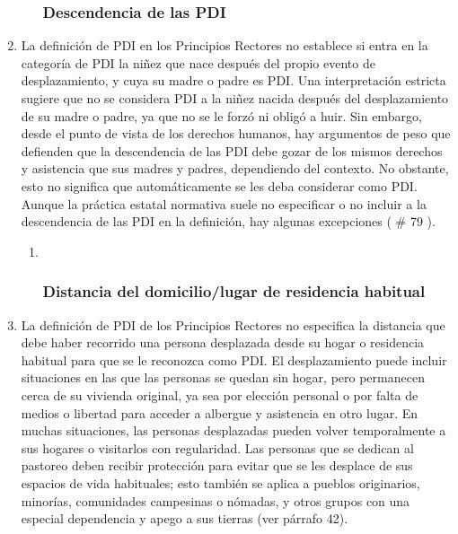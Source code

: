 \documentclass[
]{book}
\begin{document}
\begin{enumerate}
\begin{enumerate}
{    \subsubsection{Descendencia de las PDI}\label{descendencia-de-las-pdi}}
  \end{enumerate}
\item
  La definición de PDI en los Principios Rectores no establece si entra en la categoría de PDI la niñez que nace después del propio evento de desplazamiento, y cuya su madre o padre es PDI. Una interpretación estricta sugiere que no se considera PDI a la niñez nacida después del desplazamiento de su madre o padre, ya que no se le forzó ni obligó a huir. Sin embargo, desde el punto de vista de los derechos humanos, hay argumentos de peso que defienden que la descendencia de las PDI debe gozar de los mismos derechos y asistencia que sus madres y padres, dependiendo del contexto. No obstante, esto no significa que automáticamente se les deba considerar como PDI. Aunque la práctica estatal normativa suele no especificar o no incluir a la descendencia de las PDI en la definición, hay algunas excepciones (
  \# 79
  ).

  \begin{enumerate}
  \def\labelenumii{\arabic{enumii}.}
  \item ~
    \hypertarget{distancia-del-domiciliolugar-de-residencia-habitual}{%
    \subsubsection{Distancia del domicilio/lugar de residencia habitual}\label{distancia-del-domiciliolugar-de-residencia-habitual}}
  \end{enumerate}
\item
  La definición de PDI de los Principios Rectores no especifica la distancia que debe haber recorrido una persona desplazada desde su hogar o residencia habitual para que se le reconozca como PDI. El desplazamiento puede incluir situaciones en las que las personas se quedan sin hogar, pero permanecen cerca de su vivienda original, ya sea por elección personal o por falta de medios o libertad para acceder a albergue y asistencia en otro lugar. En muchas situaciones, las personas desplazadas pueden volver temporalmente a sus hogares o visitarlos con regularidad. Las personas que se dedican al pastoreo deben recibir protección para evitar que se les desplace de sus espacios de vida habituales; esto también se aplica a pueblos originarios, minorías, comunidades campesinas o nómadas, y otros grupos con una especial dependencia y apego a sus tierras (ver párrafo 42).


\end{enumerate}
\end{document}
